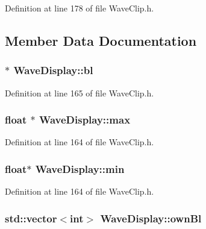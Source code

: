 Definition at line 178 of file Wave\+Clip.\+h.



\subsection{Member Data Documentation}
\subsubsection[{\texorpdfstring{bl}{bl}}]{$\ast$ Wave\+Display\+::bl}\hypertarget{class_wave_display_a607b91b920b3688ea7eeb01bf302debf}{}\label{class_wave_display_a607b91b920b3688ea7eeb01bf302debf}


Definition at line 165 of file Wave\+Clip.\+h.

\subsubsection[{\texorpdfstring{max}{max}}]{\setlength{\rightskip}{0pt plus 5cm}float $\ast$ Wave\+Display\+::max}\hypertarget{class_wave_display_ab2a1f71c47f052041fbcbdac889be828}{}\label{class_wave_display_ab2a1f71c47f052041fbcbdac889be828}


Definition at line 164 of file Wave\+Clip.\+h.

\subsubsection[{\texorpdfstring{min}{min}}]{\setlength{\rightskip}{0pt plus 5cm}float$\ast$ Wave\+Display\+::min}\hypertarget{class_wave_display_a9ff4ca6d4c9be28c6f3cb3f806c41913}{}\label{class_wave_display_a9ff4ca6d4c9be28c6f3cb3f806c41913}


Definition at line 164 of file Wave\+Clip.\+h.

\subsubsection[{\texorpdfstring{own\+Bl}{ownBl}}]{\setlength{\rightskip}{0pt plus 5cm}std\+::vector$<${\bf int}$>$ Wave\+Display\+::own\+Bl}\hypertarget{class_wave_display_ae2f6511a16c81ed1ca2b1d87ef55560b}{}\label{class_wave_display_ae2f6511a16c81ed1ca2b1d87ef55560b}


